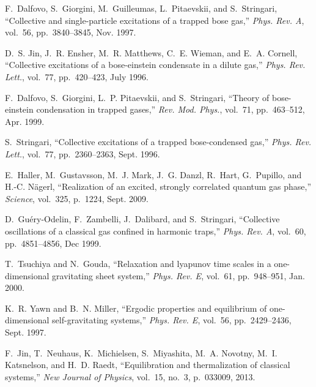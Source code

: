 \documentclass[aps,preprintnumbers,onecolumn,amsmath,amssymb,floatfix,pra]{revtex4-1}
\begin{document}
%
% 



\begin{thebibliography}{1}

F.~Dalfovo, S.~Giorgini, M.~Guilleumas, L.~Pitaevskii, and S.~Stringari,
  ``Collective and single-particle excitations of a trapped bose gas,'' {\em
  Phys. Rev. A}, vol.~56, pp.~3840--3845, Nov. 1997.

D.~S. Jin, J.~R. Ensher, M.~R. Matthews, C.~E. Wieman, and E.~A. Cornell,
  ``Collective excitations of a bose-einstein condensate in a dilute gas,''
  {\em Phys. Rev. Lett.}, vol.~77, pp.~420--423, July 1996.

F.~Dalfovo, S.~Giorgini, L.~P. Pitaevskii, and S.~Stringari, ``Theory of
  bose-einstein condensation in trapped gases,'' {\em Rev. Mod. Phys.},
  vol.~71, pp.~463--512, Apr. 1999.

S.~Stringari, ``Collective excitations of a trapped bose-condensed gas,'' {\em
  Phys. Rev. Lett.}, vol.~77, pp.~2360--2363, Sept. 1996.

E.~Haller, M.~Gustavsson, M.~J. Mark, J.~G. Danzl, R.~Hart, G.~Pupillo, and
  H.-C. Nägerl, ``Realization of an excited, strongly correlated quantum gas
  phase,'' {\em Science}, vol.~325, p.~1224, Sept. 2009.

D.~Gu\'ery-Odelin, F.~Zambelli, J.~Dalibard, and S.~Stringari, ``Collective
  oscillations of a classical gas confined in harmonic traps,'' {\em Phys. Rev.
  A}, vol.~60, pp.~4851--4856, Dec 1999.

T.~Tsuchiya and N.~Gouda, ``Relaxation and lyapunov time scales in a
  one-dimensional gravitating sheet system,'' {\em Phys. Rev. E}, vol.~61,
  pp.~948--951, Jan. 2000.

K.~R. Yawn and B.~N. Miller, ``Ergodic properties and equilibrium of
  one-dimensional self-gravitating systems,'' {\em Phys. Rev. E}, vol.~56,
  pp.~2429--2436, Sept. 1997.

F.~Jin, T.~Neuhaus, K.~Michielsen, S.~Miyashita, M.~A. Novotny, M.~I.
  Katsnelson, and H.~D. Raedt, ``Equilibration and thermalization of classical
  systems,'' {\em New Journal of Physics}, vol.~15, no.~3, p.~033009, 2013.

\end{thebibliography}




 
\end{document}
